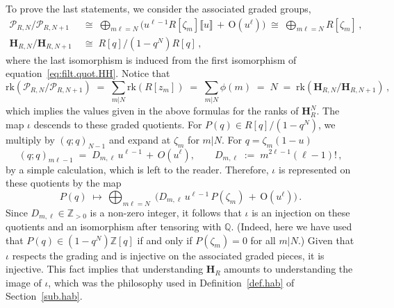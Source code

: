\documentclass[12pt,reqno]{amsart}
\theoremstyle{definition}
\def\BZ{\mathbb Z}
\def\BQ{\mathbb Q}
\def\calP{\mathcal P}
\def\HH{\mathbf H}
\def\be{\begin{equation}}
\def\ee{\end{equation}}
\def\z{\zeta}
\def\={\;=\;}
\def\+{\,+\,}
\begin{document}
To prove the last statements, we consider the associated graded groups,
\be
\begin{aligned}
\calP_{R,N}/\calP_{R,N+1}
&\;\cong\;
\bigoplus_{m\ell=N}
\big(u^{\ell-1}R[\z_m]\llbracket u\rrbracket\+\mathrm{O}(u^{\ell})\big)
\;\cong\;
\bigoplus_{m\ell=N}R[\z_m]\,,\\
\HH_{R,N}/\HH_{R,N+1}
&\;\cong\;
R[q]/(1-q^N)R[q]\,,
\end{aligned}
\ee
where the last isomorphism is induced from the first isomorphism of
equation~\eqref{eq:filt.quot.HH}. Notice that
\be
\mathrm{rk}(\calP_{R,N}/\calP_{R,N+1})
\=
\sum_{m|N} \mathrm{rk}(R[z_m])
\=
\sum_{m|N} \phi(m)
\= N \= \mathrm{rk}(\HH_{R,N}/\HH_{R,N+1})\,,
\ee
which implies the values given in the above formulas for the ranks of $\HH_{R}^N$.
The map $\iota$ descends to these graded quotients. For $P(q)\in R[q]/(1-q^{N})$,
we multiply by $(q;q)_{N-1}$ and expand at $\z_m$ for $m|N$.
For
$q=\z_m(1-u)$
\be
\label{eq:poch.dml}
(q;q)_{m\ell-1}
\=
D_{m,\ell}\,u^{\ell-1}\+ O(u^\ell),
\qquad D_{m,\ell} \;:=\;m^{2\ell-1}(\ell-1)!\,,
\ee
by a simple calculation, which is left to the reader.
Therefore, $\iota$ is represented on these quotients by the map
\be
P(q)
\;\mapsto\,
\bigoplus_{m\ell=N}\;
\big(
D_{m,\ell}\,u^{\ell-1}\,
P(\z_m)\+\mathrm{O}(u^{\ell})\big)\,.
\ee
Since $D_{m,\ell}\in\BZ_{>0}$ is a non-zero integer, it follows that
$\iota$ is an injection
on these quotients and an isomorphism after tensoring with $\BQ$.
(Indeed, here we have used that $P(q)\in(1-q^N)\BZ[q]$ if and only if $P(\z_m)=0$
for all $m|N$.)
Given that $\iota$ respects the grading and is injective on the associated graded
pieces, it is injective.
This fact implies that understanding $\HH_R$ amounts to understanding the image of
$\iota$, which was the philosophy used in Definition~\ref{def.hab} of
Section~\ref{sub.hab}.

\medskip
\end{document}
